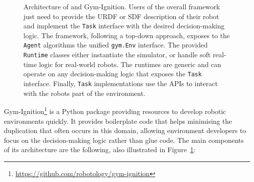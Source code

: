 \begin{figure}
    \centering
    \caption{Architecture of \scenario and Gym-Ignition. Users of the overall framework just need to provide the \acs{URDF} or \acs{SDF} description of their robot and implement the \texttt{Task} interface with the desired decision-making logic. The framework, following a top-down approach, exposes to the \texttt{Agent} algorithms the unified \texttt{gym.Env} interface. The provided \texttt{Runtime} classes either instantiate the simulator, or handle soft real-time logic for real-world robots. The runtimes are generic and can operate on any decision-making logic that exposes the \texttt{Task} interface. Finally, \texttt{Task} implementations use the \scenario \acp{API} to interact with the robots part of the environment.}
    \label{fig:scenario_and_gym_ignition}
\end{figure}

Gym-Ignition\footnote{\url{https://github.com/robotology/gym-ignition}} is a Python package providing resources to develop robotic environments quickly.
It provides boilerplate code that helps minimising the duplication that often occurs in this domain, allowing environment developers to focus on the decision-making logic rather than glue code.
The main components of its architecture are the following, also illustrated in Figure~\ref{fig:scenario_and_gym_ignition}: 

